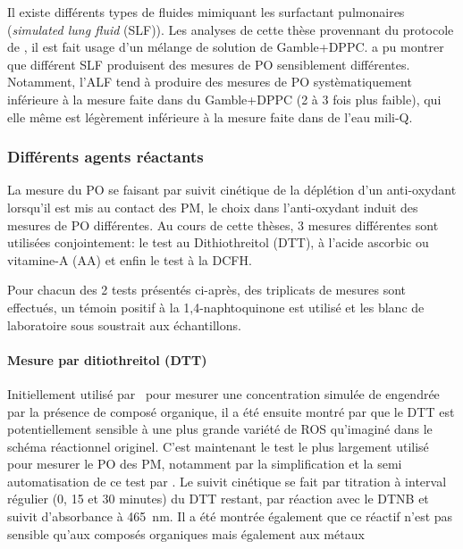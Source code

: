 Il existe différents types de fluides mimiquant les surfactant pulmonaires (\textit{simulated
lung fluid} (SLF)). Les analyses de cette thèse provennant du protocole de
\textcite{calasPollution2017}, il est fait usage d'un mélange de solution de Gamble+DPPC.
\textcite{calasImportance2017} a pu montrer que différent SLF produisent des mesures de PO
sensiblement différentes. Notamment, l'ALF tend à produire des mesures de PO
systèmatiquement inférieure à la mesure faite dans du Gamble+DPPC (2 à 3 fois plus
faible), qui elle même est légèrement inférieure à la mesure faite dans de l'eau mili-Q.

\subsubsection{Différents agents réactants}%
\label{ssub:differents_agent_reactant}

La mesure du PO se faisant par suivit cinétique de la déplétion d'un anti-oxydant
lorsqu'il est mis au contact des PM, le choix dans l'anti-oxydant induit des mesures de PO
différentes. Au cours de cette thèses, 3 mesures différentes sont utilisées conjointement:
le test au Dithiothreitol (DTT), à l'acide ascorbic ou vitamine-A (AA) et enfin le test à
la DCFH.

Pour chacun des 2 tests présentés ci-après, des triplicats de mesures sont effectués, un
témoin positif à la 1,4-naphtoquinone est utilisé et les blanc de laboratoire sous
soustrait aux échantillons.

\paragraph{Mesure par ditiothreitol (DTT)}%
\label{ssub:mesure_par_ditiothreitol}

Initiellement utilisé par~\textcite{choRedox2005} pour mesurer une concentration simulée de
 engendrée par la présence de composé organique, il a été ensuite montré par
\textcite{beiReaction2014} que le DTT est potentiellement sensible à une plus grande
variété de ROS qu'imaginé dans le schéma réactionnel originel. C'est maintenant le test le
plus largement utilisé pour mesurer le PO des PM, notamment par la simplification et
la semi automatisation de ce test par \textcite{fangSemiautomated2015}.
Le suivit cinétique se fait par titration à interval régulier (0, 15 et 30 minutes) du DTT
restant, par réaction avec le DTNB et suivit d'absorbance à \SI{465}{nm}.
Il a été montrée également que ce réactif n'est pas sensible qu'aux composés organiques
mais également aux métaux~\autocite{charrierDithiothreitol2012,linGeneration2011}

